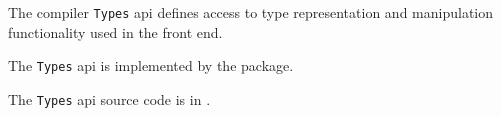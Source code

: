 
The compiler {\tt Types} api defines access to type representation and manipulation 
functionality used in the front end.

The {\tt Types} api is implemented by the  package.

The {\tt Types} api source code is in .


